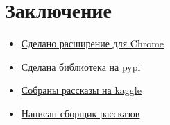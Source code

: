 \documentclass[14pt]{matmex-diploma}
\begin{document}
\section*{Заключение}        
    \begin{Large}
            \begin{itemize}
                \item \href{https://github.com/SmirnovAlexander/PoemClassifier}{Сделано расширение для Chrome}
                \item \href{https://pypi.org/project/TalesParse/}{Сделана библиотека на pypi} 
                \item \href{https://www.kaggle.com/idoldev/adult-and-child-russian-tales-dataset-with-label}{Собраны рассказы на kaggle}  
                \item \href{https://github.com/Feodoros/Scraping_Tales}{Написан сборщик рассказов}
            \end{itemize}
    \end{Large}

\setmonofont[Mapping=tex-text]{CMU Typewriter Text}


\end{document}
